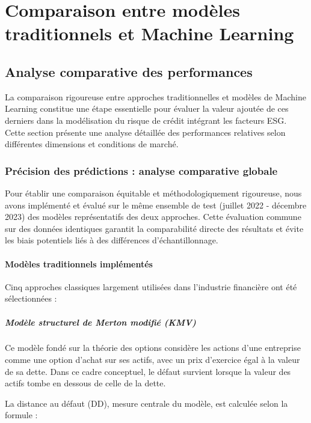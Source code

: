 \chapter{Comparaison entre modèles traditionnels et Machine Learning}

\section{Analyse comparative des performances}

La comparaison rigoureuse entre approches traditionnelles et modèles de Machine Learning constitue une étape essentielle pour évaluer la valeur ajoutée de ces derniers dans la modélisation du risque de crédit intégrant les facteurs ESG. Cette section présente une analyse détaillée des performances relatives selon différentes dimensions et conditions de marché.

\subsection{Précision des prédictions : analyse comparative globale}

Pour établir une comparaison équitable et méthodologiquement rigoureuse, nous avons implémenté et évalué sur le même ensemble de test (juillet 2022 - décembre 2023) des modèles représentatifs des deux approches. Cette évaluation commune sur des données identiques garantit la comparabilité directe des résultats et évite les biais potentiels liés à des différences d'échantillonnage.

\subsubsection{Modèles traditionnels implémentés}

Cinq approches classiques largement utilisées dans l'industrie financière ont été sélectionnées :

\paragraph{Modèle structurel de Merton modifié (KMV)} Ce modèle fondé sur la théorie des options considère les actions d'une entreprise comme une option d'achat sur ses actifs, avec un prix d'exercice égal à la valeur de sa dette. Dans ce cadre conceptuel, le défaut survient lorsque la valeur des actifs tombe en dessous de celle de la dette.

La distance au défaut (DD), mesure centrale du modèle, est calculée selon la formule :

